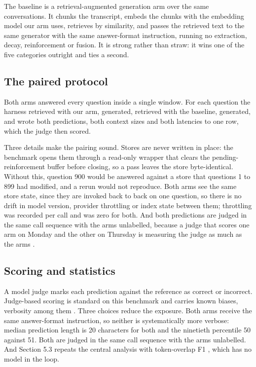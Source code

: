 \documentclass[10pt,a4paper,twocolumn]{article}
\begin{document}
The baseline is a retrieval-augmented generation arm over the same conversations. It chunks the transcript, embeds the chunks with the embedding model our arm uses, retrieves by similarity, and passes the retrieved text to the same generator with the same answer-format instruction, running no extraction, decay, reinforcement or fusion. It is strong rather than straw: it wins one of the five categories outright and ties a second.

\subsection{The paired protocol}

Both arms answered every question inside a single window. For each question the harness retrieved with our arm, generated, retrieved with the baseline, generated, and wrote both predictions, both context sizes and both latencies to one row, which the judge then scored.

Three details make the pairing sound. Stores are never written in place: the benchmark opens them through a read-only wrapper that clears the pending-reinforcement buffer before closing, so a pass leaves the store byte-identical. Without this, question 900 would be answered against a store that questions 1 to 899 had modified, and a rerun would not reproduce. Both arms see the same store state, since they are invoked back to back on one question, so there is no drift in model version, provider throttling or index state between them; throttling was recorded per call and was zero for both. And both predictions are judged in the same call sequence with the arms unlabelled, because a judge that scores one arm on Monday and the other on Thursday is measuring the judge as much as the arms \citep{zheng2023}.

\subsection{Scoring and statistics}

A model judge marks each prediction against the reference as correct or incorrect. Judge-based scoring is standard on this benchmark and carries known biases, verbosity among them \citep{zheng2023}. Three choices reduce the exposure. Both arms receive the same answer-format instruction, so neither is systematically more verbose: median prediction length is 20 characters for both and the ninetieth percentile 50 against 51. Both are judged in the same call sequence with the arms unlabelled. And Section 5.3 repeats the central analysis with token-overlap F1 \citep{rajpurkar2016}, which has no model in the loop.
\end{document}
